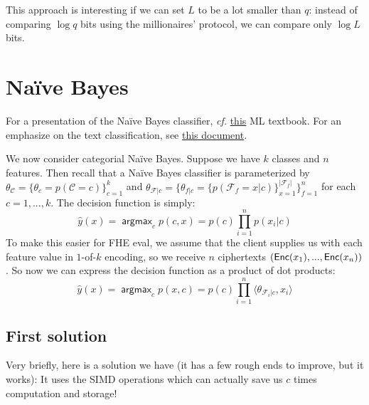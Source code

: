 \documentclass[11pt]{article}
\DeclareMathOperator*{\argmax}{\mathsf{argmax}}
\begin{document}
	This approach is interesting if we can set $L$ to be a lot smaller than $q$: instead of comparing $\log q$ bits using the millionaires' protocol, we can compare only $\log L$ bits.  
	

\section{Na\"ive Bayes}

%
\newcommand{\NB}{Na\"ive Bayes}
      
For a presentation of the \NB{} classifier, \emph{cf.} \href{http://www.cs.cmu.edu/~tom/mlbook/NBayesLogReg.pdf}{this} ML textbook. For an emphasize on the text classification, see \href{http://nlp.stanford.edu/IR-book/html/htmledition/naive-bayes-text-classification-1.html}{this document}.

We now consider categorial \NB{}. Suppose we have $k$ classes and $n$ features.
Then recall that a \NB{} classifier is parameterized by $\theta_{\mathcal{C}} =
\{\theta_{c}=p(\mathcal{C}=c)\}_{c=1}^{k}$ and $\theta_{\mathcal{F}|c} =
\{\theta_{f|c}= \{ p(\mathcal{F}_f=x|c) \}_{x=1}^{|\mathcal{F}_f|}
\}_{f=1}^{n}$ for each $c = 1,...,k$. The decision function is simply:
\begin{equation*}
  \hat{y}(x) = \argmax_{c} p(c, x) = p(c)\prod\limits_{i=1}^{n}p(x_i|c)
\end{equation*}
To make this easier for FHE eval, we assume that the client supplies us with each feature value
in $1$-of-$k$ encoding, so we receive $n$ ciphertexts $(\mathsf{Enc}(x_1), ..., \mathsf{Enc}(x_n))$. So now we
can express the decision function as a product of dot products:
\begin{equation*}
  \hat{y}(x) = \argmax_{c} p(x,c) = p(c)\prod\limits_{i=1}^{n} \langle \theta_{\mathcal{F}_i|c}, x_i \rangle
\end{equation*}

      
\subsection{First solution} %
\label{sub:bayes_solution_1}

Very briefly, here is a solution we have (it has a few rough ends to improve, but it works): It uses the SIMD operations which can actually save us $c$ times computation and storage!
\end{document}
